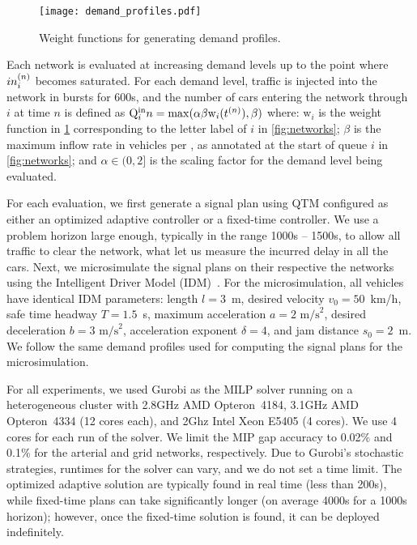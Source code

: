 \begin{figure}[t]
\centering
\texttt{[image: demand\_profiles.pdf]}
\caption{Weight functions for generating demand profiles.}
\label{fig:demand_profiles}
\end{figure}


%
%
Each network is evaluated at increasing demand levels up to the point where
$\inq{i}$ becomes saturated.
%
%
For each demand level, traffic is injected into the network in bursts for 600s,
and the number of cars entering the network through $i$ at time $n$ is defined
as $\QIN{i}{n} = \mathrm{max}(\alpha \beta \mathrm{w}_i(\tn[n]),\beta)$ where:
%
$\mathrm{w}_i$ is the weight function in \cref{fig:demand_profiles}
corresponding to the letter label of $i$ in \cref{fig:networks};
%
$\beta$ is the maximum inflow rate in vehicles per \DT, as annotated at the
start of queue $i$ in \cref{fig:networks}; and
%
$\alpha \in (0,2]$ is the scaling factor for the demand level being evaluated.


For each evaluation, we first generate a signal plan using QTM configured as
either an optimized adaptive controller or a fixed-time controller.
%
We use a problem horizon \TMAX large enough, typically in the range 1000s --
1500s, to allow all traffic to clear the network, what let us measure the
incurred delay in all the cars.
%
Next, we microsimulate the signal plans on their respective the networks using
the Intelligent Driver Model (IDM)~\cite{treiber2000congested}.
%
For the microsimulation, all vehicles have identical IDM parameters: length
$l=3$~m, desired velocity $v_0 = 50$~km/h, safe time headway $T=1.5$~s, maximum
acceleration $a=2 \text{ m/s}^2$, desired deceleration $b = 3 \text{ m/s}^2$,
acceleration exponent $\delta = 4$, and jam distance $s_0 = 2$~m.
%
We follow the same demand profiles used for computing the signal plans for the
microsimulation.


For all experiments, we used Gurobi as the MILP solver running on a
heterogeneous cluster with 2.8GHz AMD Opteron~4184, 3.1GHz AMD Opteron~4334 (12
cores each), and 2Ghz Intel Xeon E5405 (4 cores). We use 4 cores for each run of
the solver.
%
We limit the MIP gap accuracy to 0.02\% and 0.1\% for the arterial and grid
networks, respectively.
%
Due to Gurobi's stochastic strategies, runtimes for the solver can vary, and we
do not set a time limit.
%
The optimized adaptive solution are typically found in real time (less than
200s), while fixed-time plans can take significantly longer (on average 4000s
for a 1000s horizon); however, once the fixed-time solution is found, it can be
deployed indefinitely.
%




